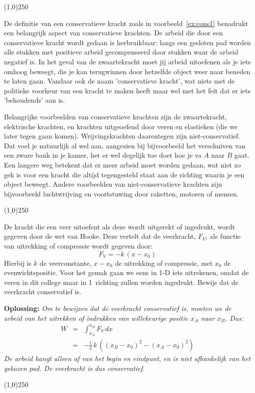 \begin{center}
\line(1,0){250}
\end{center}
De definitie van een conservatieve kracht zoals in voorbeeld~\ref{ex:cons1} benadrukt
een belangrijk aspect van conservatieve krachten. De arbeid die door een conservatieve
kracht wordt gedaan is herbruikbaar: langs een gesloten pad worden alle stukken met
positieve arbeid gecompenseerd door stukken waar de arbeid negatief is. In het geval
van de zwaartekracht moet jij arbeid uitoefenen als je iets omhoog beweegt, die je kan
terugwinnen door hetzelfde object weer naar beneden te laten gaan. Vandaar ook de
naam 'conservatieve kracht', wat niets met de politieke voorkeur van een kracht te maken
heeft maar wel met het feit dat er iets 'behoudends' aan is.

Belangrijke voorbeelden van conservatieve krachten zijn de zwaartekracht, elektrische krachten,
en krachten uitgeoefend door veren en elastieken (die we later tegen gaan komen). 
Wrijvingskrachten daarentegen zijn niet-conservatief. Dat voel je natuurlijk al wel aan, aangezien
bij bijvoorbeeld het verschuiven van een zware bank in je kamer, het er wel degelijk toe doet
hoe je va $A$ naar $B$ gaat. Een langere weg betekent dat er meer arbeid moet worden gedaan, 
wat niet zo gek is voor een kracht die altijd tegengesteld staat aan de richting waarin je een
object beweegt. Andere voorbeelden van niet-conservatieve krachten zijn bijvoorbeeld
luchtwrijving en voortstuwing door raketten, motoren of mensen. 

\begin{center}
\line(1,0){250}
\end{center}
\begin{voorbeeld} \label{ex:veer1}
De kracht die een veer uitoefent als deze wordt uitgerekt of ingedrukt, wordt gegeven door 
de wet van Hooke. Deze vertelt dat de veerkracht, $F_V$, als functie van uitrekking of compressie 
wordt gegeven door:
\begin{equation}
F_V = -k\,(x -x_0)
\end{equation}
Hierbij is $k$ de veerconstante, $x-x_0$ de uitrekking of compressie, met $x_0$ de evenwichtspositie. Voor 
het gemak gaan we eens in 1-D iets uitrekenen, omdat de veren in dit college maar in 1~richting zullen worden 
ingedrukt. Bewijs dat de veerkracht conservatief is.

{\bf Oplossing: }{\it Om te bewijzen dat de veerkracht conservatief is, moeten we de arbeid van het uitrekken of indrukken
van willekeurige positie $x_A$ naar $x_B$. Dus:
\begin{eqnarray}
W & =  & \int_{x_A}^{x_B} F_V \, dx  \\
    & =  & -\frac{1}{2}\,k\,((x_B-x_0)^2 - (x_A-x_0)^2)
\end{eqnarray}
De arbeid hangt alleen af van het begin en eindpunt, en is niet afhankelijk van het gekozen pad. De 
veerkracht is dus conservatief.
}
\end{voorbeeld}
\begin{center}
\line(1,0){250}
\end{center}

